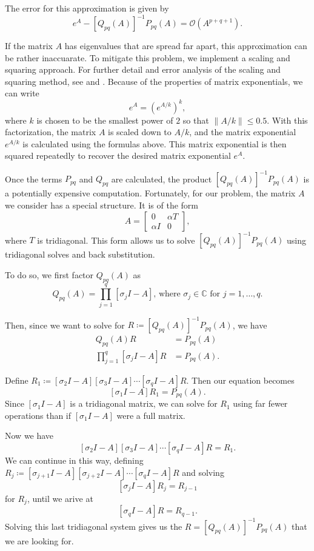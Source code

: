 \documentclass{csri19}
\begin{document}
The error for this approximation is given by
\[ e^A - \left[Q_{pq}(A)\right]^{-1}P_{pq}(A) = \mathcal{O}(A^{p+q+1}).\]

If the matrix $A$ has eigenvalues that are spread far apart, this 
approximation can be rather inaccuarate. To mitigate this problem, we 
implement a scaling and squaring approach. For further detail and error
analysis of the scaling and squaring method, see \cite{CFK:higham2005}
and \cite{CFK:Al-Mohy2009}. Because of the properties of 
matrix exponentials, we can write
\[e^{A} = \left(e^{A/k}\right)^k,\]
where $k$ is chosen to be the smallest power of $2$ so that 
$\|A/k\| \leq 0.5$. With this factorization, the matrix $A$ is scaled down
 to $A/k$, and the matrix exponential $e^{A/k}$ is calculated using the 
formulas above. This matrix exponential is then squared repeatedly to 
recover the desired matrix exponential $e^{A}$.

Once the terms $P_{pq}$ and $Q_{pq}$ are calculated, the product 
$\left[Q_{pq}(A)\right]^{-1}P_{pq}(A)$ is a potentially expensive 
computation. Fortunately, for our problem, the matrix $A$ we consider has a
 special structure. It is of the form 
\[A= \begin{bmatrix} 0 & \alpha T\\
  \alpha I & 0 \end{bmatrix},\]
where $T$ is tridiagonal. This form allows us to solve 
$\left[Q_{pq}(A)\right]^{-1}P_{pq}(A)$ using tridiagonal solves and back 
substitution.

To do so, we first factor $Q_{pq}(A)$ as
\[ Q_{pq}(A) = \prod_{j=1}^q\left[\sigma_jI-A\right]\text{, where }\sigma_j\in \mathbb{C}\text{ for }j=1,\dots,q.\]

Then, since we want to solve for 
$R \coloneqq \left[Q_{pq}(A)\right]^{-1}P_{pq}(A)$, we have
\begin{align*}
Q_{pq}(A) R &= P_{pq}(A)\\
\prod_{j=1}^q\left[\sigma_jI-A\right]R &= P_{pq}(A).
\end{align*}

Define $R_1 \coloneqq \left[\sigma_2I-A\right]\left[\sigma_3I-A\right]\cdots\left[\sigma_qI-A\right]R$.
Then our equation becomes
\[ \left[\sigma_1I-A\right]R_1 = P_{pq}(A).\] Since $\left[\sigma_1I-A\right]$ 
is a tridiagonal matrix, we can solve for $R_1$ using far fewer operations
 than if $\left[\sigma_1I-A\right]$ were a full matrix.

Now we have
\[\left[\sigma_2I-A\right]\left[\sigma_3I-A\right]\cdots\left[\sigma_qI-A\right]R = R_1.\] 
We can continue in this way, defining 
$R_j \coloneqq \left[\sigma_{j+1}I-A\right]\left[\sigma_{j+2}I-A\right]\cdots\left[\sigma_qI-A\right]R$
 and solving
\[\left[\sigma_jI-A\right]R_j = R_{j-1}\] 
for $R_j$, until we arive at
\[\left[\sigma_qI-A\right]R = R_{q-1}.\] 
Solving this last tridiagonal system gives us the $R = \left[Q_{pq}(A)\right]^{-1}P_{pq}(A)$
 that we are looking for.
\end{document}
